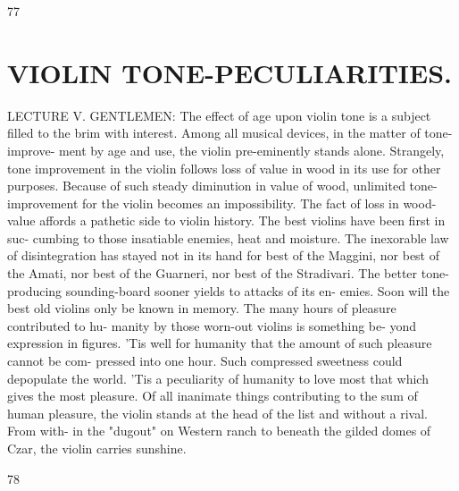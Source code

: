 \documentclass{article}
\begin{document}
77

\section*{VIOLIN TONE-PECULIARITIES.}
LECTURE V. GENTLEMEN: The effect of age upon violin tone is a subject filled to the brim with interest. Among all musical devices, in the matter of tone-improve- ment by age and use, the violin pre-eminently stands alone. Strangely, tone improvement in the violin follows loss of value in wood in its use for other purposes. Because of such steady diminution in value of wood, unlimited tone-improvement for the violin becomes an impossibility. The fact of loss in wood-value affords a pathetic side to violin history. The best violins have been first in suc- cumbing to those insatiable enemies, heat and moisture. The inexorable law of disintegration has stayed not in its hand for best of the Maggini, nor best of the Amati, nor best of the Guarneri, nor best of the Stradivari. The better tone-producing sounding-board sooner yields to attacks of its en- emies. Soon will the best old violins only be known in memory. The many hours of pleasure contributed to hu- manity by those worn-out violins is something be- yond expression in figures. 'Tis well for humanity that the amount of such pleasure cannot be com- pressed into one hour. Such compressed sweetness could depopulate the world. 'Tis a peculiarity of humanity to love most that which gives the most pleasure. Of all inanimate things contributing to the sum of human pleasure, the violin stands at the head of the list and without a rival. From with- in the "dugout" on Western ranch to beneath the gilded domes of Czar, the violin carries sunshine.

78
\end{document}
